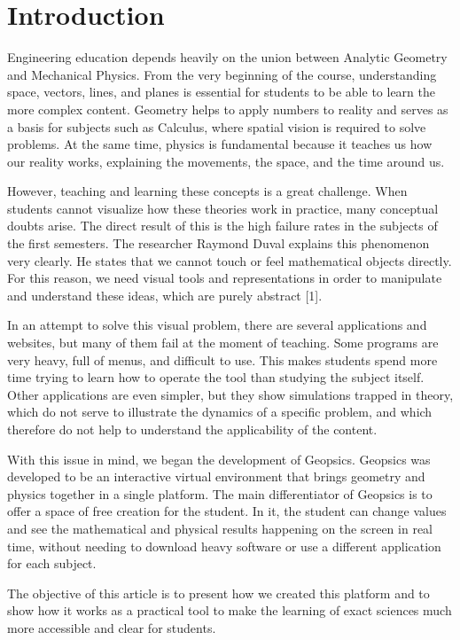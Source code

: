 \documentclass[conference,a4paper]{IEEEtran}
\begin{document}
\section{Introduction}

Engineering education depends heavily on the union between Analytic Geometry and Mechanical Physics. From the very beginning of the course, understanding space, vectors, lines, and planes is essential for students to be able to learn the more complex content. Geometry helps to apply numbers to reality and serves as a basis for subjects such as Calculus, where spatial vision is required to solve problems. At the same time, physics is fundamental because it teaches us how our reality works, explaining the movements, the space, and the time around us.

However, teaching and learning these concepts is a great challenge. When students cannot visualize how these theories work in practice, many conceptual doubts arise. The direct result of this is the high failure rates in the subjects of the first semesters. The researcher Raymond Duval explains this phenomenon very clearly. He states that we cannot touch or feel mathematical objects directly. For this reason, we need visual tools and representations in order to manipulate and understand these ideas, which are purely abstract [1].

In an attempt to solve this visual problem, there are several applications and websites, but many of them fail at the moment of teaching. Some programs are very heavy, full of menus, and difficult to use. This makes students spend more time trying to learn how to operate the tool than studying the subject itself. Other applications are even simpler, but they show simulations trapped in theory, which do not serve to illustrate the dynamics of a specific problem, and which therefore do not help to understand the applicability of the content.

With this issue in mind, we began the development of Geopsics. Geopsics was developed to be an interactive virtual environment that brings geometry and physics together in a single platform. The main differentiator of Geopsics is to offer a space of free creation for the student. In it, the student can change values and see the mathematical and physical results happening on the screen in real time, without needing to download heavy software or use a different application for each subject.

The objective of this article is to present how we created this platform and to show how it works as a practical tool to make the learning of exact sciences much more accessible and clear for students.
\end{document}
